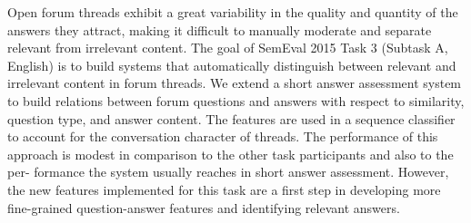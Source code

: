 Open forum threads exhibit a great variability in the quality and quantity of the answers they attract, making it difficult to manually moderate and separate relevant from irrelevant content. The goal of SemEval 2015 Task 3 (Subtask A, English) is to build systems that automatically distinguish between relevant and irrelevant content in forum threads. We extend a short answer assessment system to build relations between forum questions and answers with respect to similarity, question type, and answer content. The features are used in a sequence classifier to account for the conversation character of threads. The performance of this approach is modest in comparison to the other task participants and also to the per- formance the system usually reaches in short answer assessment. However, the new features implemented for this task are a first step in developing more fine-grained question-answer features and identifying relevant answers.

